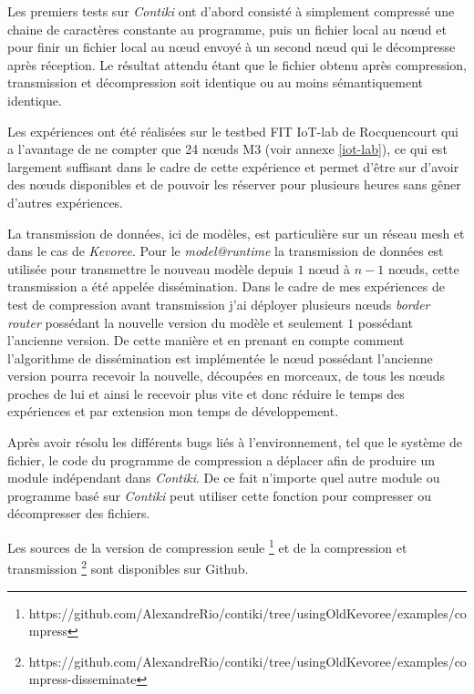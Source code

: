 Les premiers tests sur \emph{Contiki} ont d'abord consisté à simplement compressé une   chaine de caractères constante au programme, puis un fichier local au nœud et pour finir un fichier local au nœud envoyé à un second nœud qui le décompresse après réception. Le résultat attendu étant que le fichier obtenu après compression, transmission et décompression soit identique ou au moins sémantiquement identique.

Les expériences ont été réalisées sur le testbed FIT IoT-lab de Rocquencourt qui a l'avantage de ne compter que 24 nœuds M3 (voir annexe \ref{iot-lab}), ce qui est largement suffisant dans le cadre de cette expérience et permet d'être sur d'avoir des nœuds disponibles et de pouvoir les réserver pour plusieurs heures sans gêner d'autres expériences.

La transmission de données, ici de modèles, est particulière sur un réseau mesh et dans le cas de \emph{Kevoree}. Pour le \emph{model@runtime} la transmission de données est utilisée pour transmettre le nouveau modèle depuis $1$ nœud à $n-1$ nœuds, cette transmission a été appelée dissémination. Dans le cadre de mes expériences de test de compression avant transmission j'ai déployer plusieurs nœuds \emph{border router} possédant la nouvelle version du modèle et seulement $1$ possédant l'ancienne version. De cette manière et en prenant en compte comment l'algorithme de dissémination est implémentée le nœud possédant l'ancienne version pourra recevoir la nouvelle, découpées en morceaux, de tous les nœuds proches de lui et ainsi le recevoir plus vite et donc réduire le temps des expériences et par extension mon temps de développement.

Après avoir résolu les différents bugs liés à l'environnement, tel que le système de fichier, le code du programme de compression a déplacer afin de produire un module indépendant dans \emph{Contiki}. De ce fait n'importe quel autre module ou programme basé sur \emph{Contiki} peut utiliser cette fonction pour compresser ou décompresser des fichiers.

Les sources de la version de compression seule \footnote{https://github.com/AlexandreRio/contiki/tree/usingOldKevoree/examples/compress} et de la compression et transmission \footnote{https://github.com/AlexandreRio/contiki/tree/usingOldKevoree/examples/compress-disseminate} sont disponibles sur Github.
